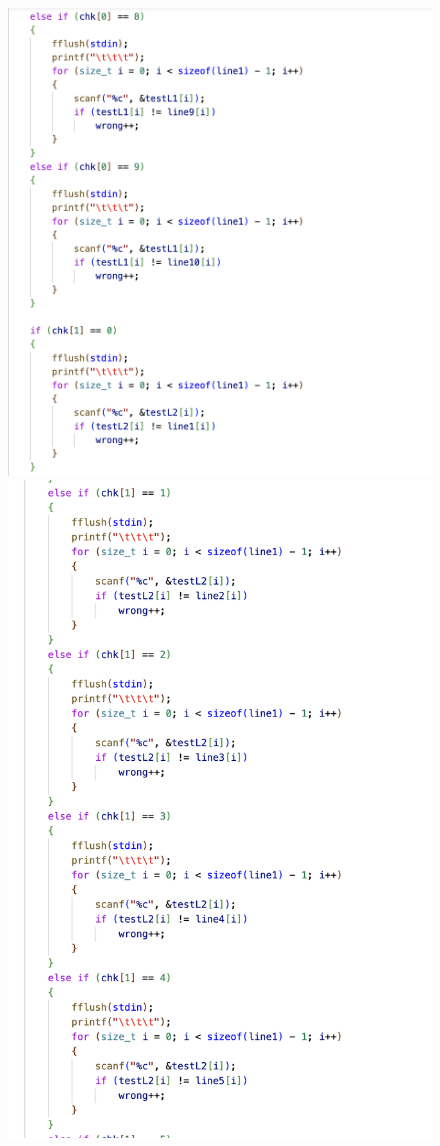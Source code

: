 \begin{figure}[h]
     \includegraphics[scale=0.15]{CodeScreenShot/speedtest-7.png}
     \includegraphics[scale=0.15]{CodeScreenShot/speedtest-8.png}

\end{figure}
